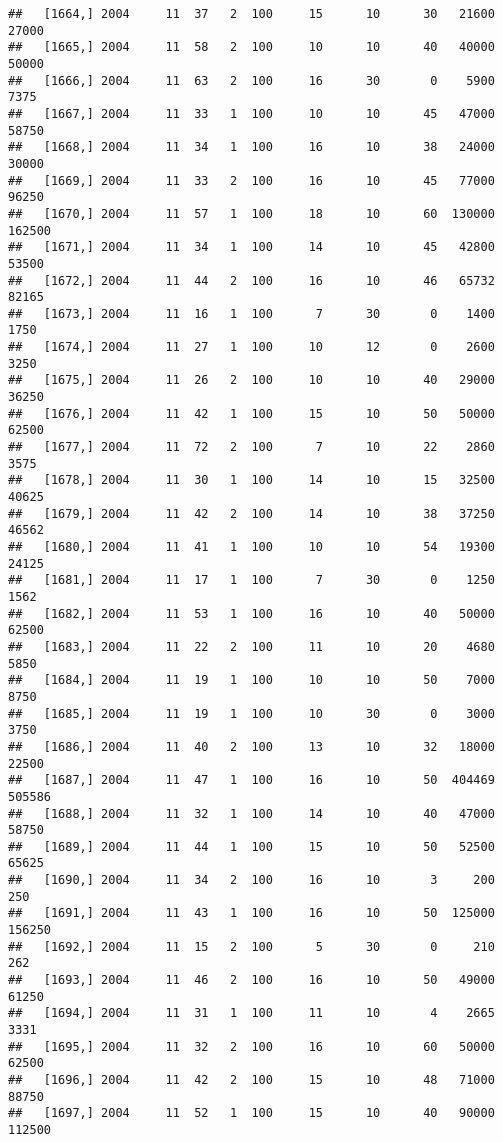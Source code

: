 \documentclass{article}\usepackage[]{graphicx}\usepackage[]{color}
\makeatletter
\newenvironment{kframe}{%
 \def\at@end@of@kframe{}%
 \ifinner\ifhmode%
  \def\at@end@of@kframe{\end{minipage}}%
  \begin{minipage}{\columnwidth}%
 \fi\fi%
 \def\FrameCommand##1{\hskip\@totalleftmargin \hskip-\fboxsep
 \colorbox{shadecolor}{##1}\hskip-\fboxsep
     \hskip-\linewidth \hskip-\@totalleftmargin \hskip\columnwidth}%
 \MakeFramed {\advance\hsize-\width
   \@totalleftmargin\z@ \linewidth\hsize
   \@setminipage}}%
 {\par\unskip\endMakeFramed%
 \at@end@of@kframe}
\newenvironment{knitrout}{}{} %
\makeatother
\begin{document}
\begin{knitrout}
\begin{kframe}
\begin{verbatim}
##   [1664,] 2004     11  37   2  100     15      10      30   21600   27000
##   [1665,] 2004     11  58   2  100     10      10      40   40000   50000
##   [1666,] 2004     11  63   2  100     16      30       0    5900    7375
##   [1667,] 2004     11  33   1  100     10      10      45   47000   58750
##   [1668,] 2004     11  34   1  100     16      10      38   24000   30000
##   [1669,] 2004     11  33   2  100     16      10      45   77000   96250
##   [1670,] 2004     11  57   1  100     18      10      60  130000  162500
##   [1671,] 2004     11  34   1  100     14      10      45   42800   53500
##   [1672,] 2004     11  44   2  100     16      10      46   65732   82165
##   [1673,] 2004     11  16   1  100      7      30       0    1400    1750
##   [1674,] 2004     11  27   1  100     10      12       0    2600    3250
##   [1675,] 2004     11  26   2  100     10      10      40   29000   36250
##   [1676,] 2004     11  42   1  100     15      10      50   50000   62500
##   [1677,] 2004     11  72   2  100      7      10      22    2860    3575
##   [1678,] 2004     11  30   1  100     14      10      15   32500   40625
##   [1679,] 2004     11  42   2  100     14      10      38   37250   46562
##   [1680,] 2004     11  41   1  100     10      10      54   19300   24125
##   [1681,] 2004     11  17   1  100      7      30       0    1250    1562
##   [1682,] 2004     11  53   1  100     16      10      40   50000   62500
##   [1683,] 2004     11  22   2  100     11      10      20    4680    5850
##   [1684,] 2004     11  19   1  100     10      10      50    7000    8750
##   [1685,] 2004     11  19   1  100     10      30       0    3000    3750
##   [1686,] 2004     11  40   2  100     13      10      32   18000   22500
##   [1687,] 2004     11  47   1  100     16      10      50  404469  505586
##   [1688,] 2004     11  32   1  100     14      10      40   47000   58750
##   [1689,] 2004     11  44   1  100     15      10      50   52500   65625
##   [1690,] 2004     11  34   2  100     16      10       3     200     250
##   [1691,] 2004     11  43   1  100     16      10      50  125000  156250
##   [1692,] 2004     11  15   2  100      5      30       0     210     262
##   [1693,] 2004     11  46   2  100     16      10      50   49000   61250
##   [1694,] 2004     11  31   1  100     11      10       4    2665    3331
##   [1695,] 2004     11  32   2  100     16      10      60   50000   62500
##   [1696,] 2004     11  42   2  100     15      10      48   71000   88750
##   [1697,] 2004     11  52   1  100     15      10      40   90000  112500

\end{verbatim}
\end{kframe}
\end{knitrout}
\end{document}
